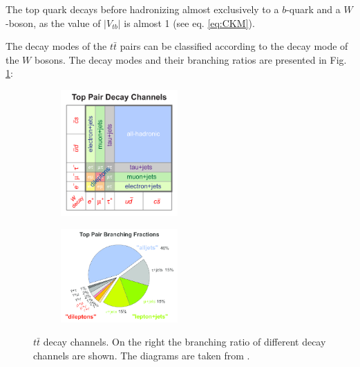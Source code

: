 The top quark decays before hadronizing almost exclusively to a $b$-quark and a $W$-boson, as the value of $|V_{tb}|$ is almost 1 (see eq. \ref{eq:CKM}).

The decay modes of the $t\bar{t}$ pairs can be classified according to the decay mode of the $W$ bosons. The decay modes and their branching ratios are presented
in Fig. \ref{fig:tt_decay}:

\begin{figure}[h]
\centering
\begin{subfigure}
  \centering
  \includegraphics[width=0.49\textwidth]{01_Theory_SM/plots/top_pair_decay_channels.png}
\end{subfigure}
\begin{subfigure}
  \centering
  \includegraphics[width=0.49\textwidth]{01_Theory_SM/plots/top_pair_branching_frac.png}
\end{subfigure}
\caption{$t\bar{t}$ decay channels. On the right the branching ratio of different decay channels are shown. The diagrams are taken from \cite{UsefulDiagrams}.}
  \label{fig:tt_decay}
\end{figure}

